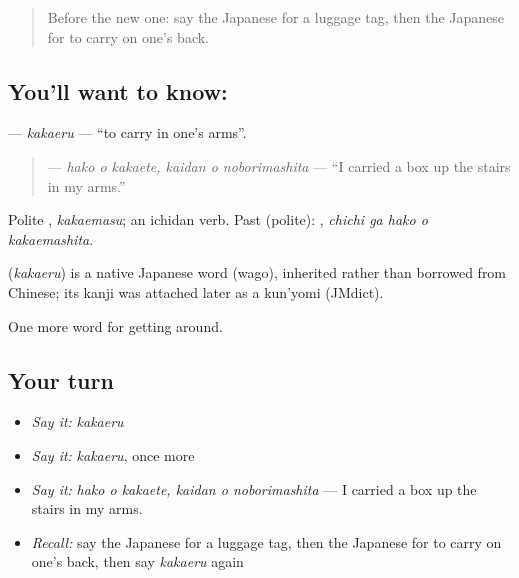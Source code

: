 \label{lesson:JA-C417-kakaeru}



\begin{quote}
Before the new one: say the Japanese for a luggage tag, then the Japanese for to carry on one's back.
\end{quote}

\subsection*{You'll want to know: }
\textbf{} — \emph{kakaeru} — \textquotedblleft{}to carry in one's arms\textquotedblright{}.

\begin{quote}
\textbf{  } — \emph{hako o kakaete, kaidan o noborimashita} — \textquotedblleft{}I carried a box up the stairs in my arms.\textquotedblright{}
\end{quote}

Polite \textbf{}, \emph{kakaemasu}; an ichidan verb. Past (polite): \textbf{  }, \emph{chichi ga hako o kakaemashita}.

\begin{cousinweb}
\textbf{} (\emph{kakaeru}) is a native Japanese word (wago), inherited rather than borrowed from Chinese; its kanji was attached later as a kun'yomi (JMdict).
\end{cousinweb}

\begin{grammarlens}[title={What you've built}]
One more word for getting around.
\end{grammarlens}

\subsection*{Your turn}
\begin{itemize}
\raggedright
  \item \emph{Say it:} \emph{kakaeru}
  \item \emph{Say it:} \emph{kakaeru}, once more
  \item \emph{Say it:} \emph{hako o kakaete, kaidan o noborimashita} — I carried a box up the stairs in my arms.
  \item \emph{Recall:} say the Japanese for a luggage tag, then the Japanese for to carry on one's back, then say \emph{kakaeru} again
\end{itemize}


